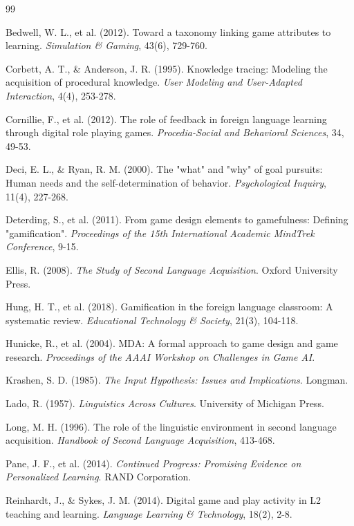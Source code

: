 \documentclass[12pt,a4paper]{article}
\begin{document}
\begin{thebibliography}{99}

Bedwell, W. L., et al. (2012). Toward a taxonomy linking game attributes to learning. \textit{Simulation \& Gaming}, 43(6), 729-760.

Corbett, A. T., \& Anderson, J. R. (1995). Knowledge tracing: Modeling the acquisition of procedural knowledge. \textit{User Modeling and User-Adapted Interaction}, 4(4), 253-278.

Cornillie, F., et al. (2012). The role of feedback in foreign language learning through digital role playing games. \textit{Procedia-Social and Behavioral Sciences}, 34, 49-53.

Deci, E. L., \& Ryan, R. M. (2000). The "what" and "why" of goal pursuits: Human needs and the self-determination of behavior. \textit{Psychological Inquiry}, 11(4), 227-268.

Deterding, S., et al. (2011). From game design elements to gamefulness: Defining "gamification". \textit{Proceedings of the 15th International Academic MindTrek Conference}, 9-15.

Ellis, R. (2008). \textit{The Study of Second Language Acquisition}. Oxford University Press.

Hung, H. T., et al. (2018). Gamification in the foreign language classroom: A systematic review. \textit{Educational Technology \& Society}, 21(3), 104-118.

Hunicke, R., et al. (2004). MDA: A formal approach to game design and game research. \textit{Proceedings of the AAAI Workshop on Challenges in Game AI}.

Krashen, S. D. (1985). \textit{The Input Hypothesis: Issues and Implications}. Longman.

Lado, R. (1957). \textit{Linguistics Across Cultures}. University of Michigan Press.

Long, M. H. (1996). The role of the linguistic environment in second language acquisition. \textit{Handbook of Second Language Acquisition}, 413-468.

Pane, J. F., et al. (2014). \textit{Continued Progress: Promising Evidence on Personalized Learning}. RAND Corporation.

Reinhardt, J., \& Sykes, J. M. (2014). Digital game and play activity in L2 teaching and learning. \textit{Language Learning \& Technology}, 18(2), 2-8.


\end{thebibliography}
\end{document}
